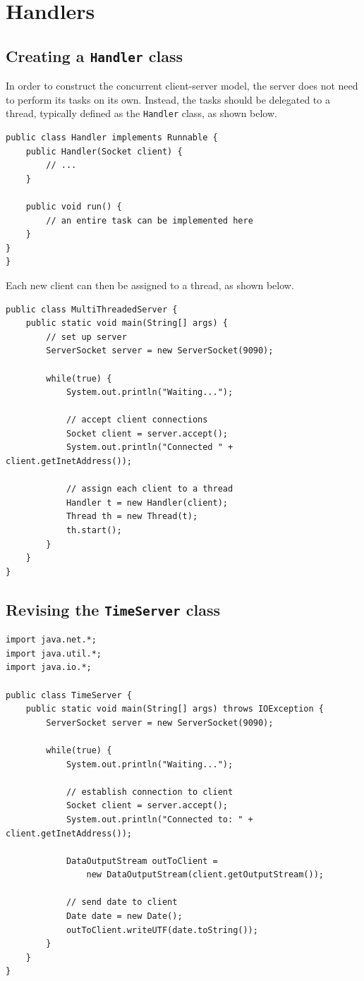 \documentclass[a4paper]{systems-software}
\begin{document}
\section*{Handlers}

\subsection*{Creating a \texttt{Handler} class}

In order to construct the concurrent client-server model, the server does not need to perform its tasks on its own. Instead, the tasks should be delegated to a thread, typically defined as the \texttt{Handler} class, as shown below.

\begin{lstlisting}[title={Handler class.}]
public class Handler implements Runnable {
	public Handler(Socket client) {
		// ...
	}
	
	public void run() {
		// an entire task can be implemented here
	}
}
}
\end{lstlisting}

Each new client can then be assigned to a thread, as shown below.

\begin{lstlisting}[title={MultiThreadedServer class.}]
public class MultiThreadedServer {
	public static void main(String[] args) {
		// set up server
		ServerSocket server = new ServerSocket(9090);
		
		while(true) {
			System.out.println("Waiting...");
			
			// accept client connections
			Socket client = server.accept();
			System.out.println("Connected " + client.getInetAddress());
			
			// assign each client to a thread
			Handler t = new Handler(client);
			Thread th = new Thread(t);
			th.start();
		}
	}
}
\end{lstlisting}


\subsection*{Revising the \texttt{TimeServer} class}

\begin{lstlisting}[title={TimeServer class.}]
import java.net.*;
import java.util.*;
import java.io.*;

public class TimeServer {
	public static void main(String[] args) throws IOException {
		ServerSocket server = new ServerSocket(9090);

		while(true) {
			System.out.println("Waiting...");

			// establish connection to client
			Socket client = server.accept();
			System.out.println("Connected to: " + client.getInetAddress());

			DataOutputStream outToClient =
				new DataOutputStream(client.getOutputStream());

			// send date to client
			Date date = new Date();
			outToClient.writeUTF(date.toString());
		}
	}
}
\end{lstlisting}
\end{document}
